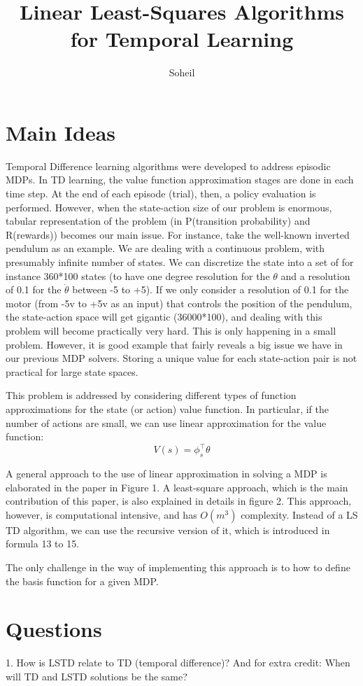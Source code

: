 \documentclass{article}
\title{Linear Least-Squares Algorithms for Temporal Learning}
\author{Soheil}
\date{}
\theoremstyle{remark}
\theoremstyle{remark}
\theoremstyle{remark}
\theoremstyle{remark}
\theoremstyle{remark}
\theoremstyle{remark}
\begin{document}
\maketitle
\section{Main Ideas}
Temporal Difference learning algorithms were developed to address episodic MDPs. In TD learning, the value function approximation stages are done in each time step. At the end of each episode (trial), then, a policy evaluation is performed. However, when the state-action size of our problem is enormous, tabular representation of the problem (in P(transition probability) and R(rewards)) becomes our main issue. For instance, take the well-known inverted pendulum as an example. We are dealing with a continuous problem, with presumably infinite number of states. We can discretize the state into a set of for instance 360*100 states (to have one degree resolution for the $\theta$ and a resolution of 0.1 for the $\dot{\theta}$ between -5 to +5). If we only consider a resolution of 0.1 for the motor (from -5v to +5v as an input) that controls the position of the pendulum, the state-action space will get gigantic (36000*100), and dealing with this problem will become practically very hard. This is only happening in a small problem. However, it is good example that fairly reveals a big issue we have in our previous MDP solvers. Storing a unique value for each state-action pair is not practical for large state spaces.

This problem is addressed by considering different types of function approximations for the state (or action) value function. In particular, if the number of actions are small, we can use linear approximation for the value function:
$$ V(s) = \phi_s^\top \theta$$

A general approach to the use of linear approximation in solving a MDP is elaborated in the paper in Figure 1. A least-square approach, which is the main contribution of this paper, is also explained in details in figure 2. This approach, however, is computational intensive, and has $O(m^3)$ complexity. Instead of a LS TD algorithm, we can use the recursive version of it, which is introduced in formula 13 to 15.

The only challenge in the way of implementing this approach is to how to define the basis function for a given MDP.

\section{Questions}
1. How is LSTD relate to TD (temporal difference)? And for extra credit: When will TD and LSTD solutions be the same?
\end{document}
